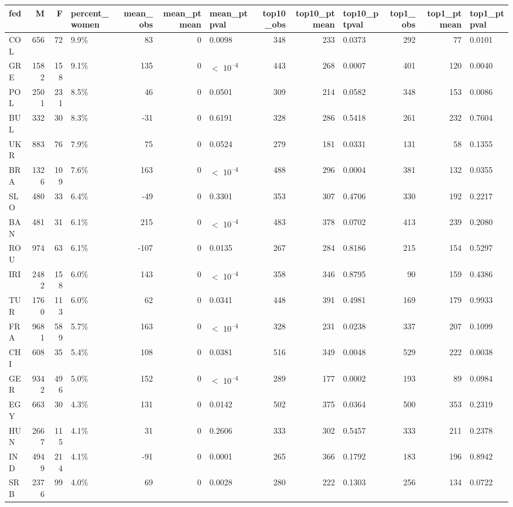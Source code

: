 
\begin{tabular}[t]{lrrlrrlrrlrrl}
\toprule
fed & M & F & percent_women & mean_obs & mean_ptmean & mean_ptpval & top10_obs & top10_ptmean & top10_ptpval & top1_obs & top1_ptmean & top1_ptpval\\
\midrule
COL & 656 & 72 & 9.9\% & 83 & 0 & 0.0098 & 348 & 233 & 0.0373 & 292 & 77 & 0.0101\\
GRE & 1582 & 158 & 9.1\% & 135 & 0 & $<$ 10\textsuperscript{--4} & 443 & 268 & 0.0007 & 401 & 120 & 0.0040\\
POL & 2501 & 231 & 8.5\% & 46 & 0 & 0.0501 & 309 & 214 & 0.0582 & 348 & 153 & 0.0086\\
BUL & 332 & 30 & 8.3\% & -31 & 0 & 0.6191 & 328 & 286 & 0.5418 & 261 & 232 & 0.7604\\
UKR & 883 & 76 & 7.9\% & 75 & 0 & 0.0524 & 279 & 181 & 0.0331 & 131 & 58 & 0.1355\\
BRA & 1326 & 109 & 7.6\% & 163 & 0 & $<$ 10\textsuperscript{--4} & 488 & 296 & 0.0004 & 381 & 132 & 0.0355\\
SLO & 480 & 33 & 6.4\% & -49 & 0 & 0.3301 & 353 & 307 & 0.4706 & 330 & 192 & 0.2217\\
BAN & 481 & 31 & 6.1\% & 215 & 0 & $<$ 10\textsuperscript{--4} & 483 & 378 & 0.0702 & 413 & 239 & 0.2080\\
ROU & 974 & 63 & 6.1\% & -107 & 0 & 0.0135 & 267 & 284 & 0.8186 & 215 & 154 & 0.5297\\
IRI & 2482 & 158 & 6.0\% & 143 & 0 & $<$ 10\textsuperscript{--4} & 358 & 346 & 0.8795 & 90 & 159 & 0.4386\\
TUR & 1760 & 113 & 6.0\% & 62 & 0 & 0.0341 & 448 & 391 & 0.4981 & 169 & 179 & 0.9933\\
FRA & 9681 & 589 & 5.7\% & 163 & 0 & $<$ 10\textsuperscript{--4} & 328 & 231 & 0.0238 & 337 & 207 & 0.1099\\
CHI & 608 & 35 & 5.4\% & 108 & 0 & 0.0381 & 516 & 349 & 0.0048 & 529 & 222 & 0.0038\\
GER & 9342 & 496 & 5.0\% & 152 & 0 & $<$ 10\textsuperscript{--4} & 289 & 177 & 0.0002 & 193 & 89 & 0.0984\\
EGY & 663 & 30 & 4.3\% & 131 & 0 & 0.0142 & 502 & 375 & 0.0364 & 500 & 353 & 0.2319\\
HUN & 2667 & 115 & 4.1\% & 31 & 0 & 0.2606 & 333 & 302 & 0.5457 & 333 & 211 & 0.2378\\
IND & 4949 & 214 & 4.1\% & -91 & 0 & 0.0001 & 265 & 366 & 0.1792 & 183 & 196 & 0.8942\\
SRB & 2376 & 99 & 4.0\% & 69 & 0 & 0.0028 & 280 & 222 & 0.1303 & 256 & 134 & 0.0722\\

\end{tabular}
